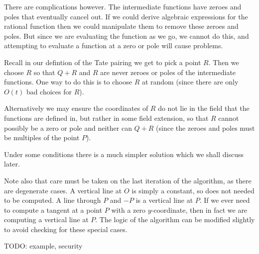 There are complications however. The intermediate functions have zeroes
and poles that eventually cancel out. If we could derive algebraic expressions
for the rational function then we could manipulate them to remove these
zeroes and poles. But since we are evaluating the function as we go,
we cannot do this, and attempting to evaluate a function at a zero
or pole will cause problems.

Recall in our defintion of the Tate pairing we get to pick a point $R$.
Then we choose $R$ so that $Q+R$ and $R$ are never zeroes or poles
of the intermediate functions. One way to do this is to choose
$R$ at random (since there are only $O(t)$ bad choices for $R$).

Alternatively we may ensure the coordinates of $R$ do not lie in the
field that the functions are defined in, but rather in some field
extension, so that
$R$ cannot possibly be a zero or pole and neither can $Q + R$ (since the
zeroes and poles must be multiples of the point $P$).

Under some conditions there is a much simpler solution which we shall
discuss later.

Note also that care must be taken on the last iteration of the algorithm,
as there are degenerate cases. A vertical line at $O$ is simply a constant,
so does not needed to be computed. A line through $P$ and $-P$ is a vertical
line at $P$. If we ever need to compute a tangent at a point $P$ with a zero
$y$-coordinate, then in fact we are computing a vertical line at $P$.
The logic of the algorithm can be modified slightly to avoid checking
for these special cases.

TODO: example, security
